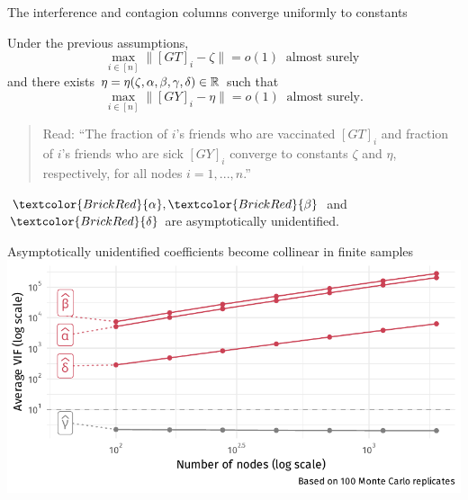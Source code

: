 \documentclass[aspectratio=169]{beamer}
\theoremstyle{remark}
\begin{document}
\begin{frame}{The interference and contagion columns converge uniformly to constants}
    
    \begin{lemma}
        Under the previous assumptions,
        \begin{equation*}
            \max_{i \in [n]} \Big\| [GT]_i - \zeta \Big\|
            = o(1) ~ \text{ almost surely }
        \end{equation*}
        and there exists $\eta = \eta(\zeta, \alpha, \beta, \gamma, \delta) \in \mathbb{R}$ such that
        \begin{equation*}
            \max_{i \in [n]} \Big\| [GY]_i - \eta \Big\|
            = o(1) ~ \text{ almost surely.}
        \end{equation*}
    \end{lemma}
    
    \begin{quote}
        \footnotesize Read: ``The fraction of $i$'s friends who are vaccinated $[GT]_i$ and fraction of $i$'s friends who are sick $[GY]_i$ converge to constants $\zeta$ and $\eta$, respectively, for all nodes $i = 1, ..., n$.''
    \end{quote}
    
    \begin{theorem}
        $\textcolor{BrickRed}{\alpha}, \textcolor{BrickRed}{\beta}$ and $\textcolor{BrickRed}{\delta}$ are asymptotically unidentified.
    \end{theorem}
\end{frame}

\begin{frame}{\textcolor{BrickRed}{Asymptotically unidentified} coefficients become collinear in finite samples}
    \vspace{3mm}
    \centering
    \includegraphics{./figures/simulations/defense-vif.pdf}
\end{frame}
\end{document}
